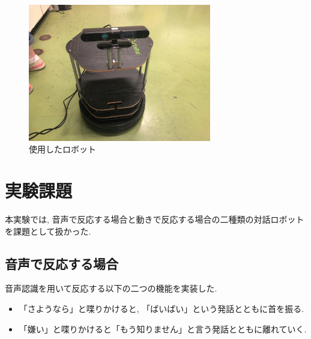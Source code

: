\documentclass[a4paper,11pt,titlepage]{jsarticle}
\begin{document}
\begin{figure}[H]
  \begin{center}
    \includegraphics[width = 8cm]{画像/robot.jpg}
    \caption{使用したロボット}
    \label{ロボット}
  \end{center}
\end{figure}

\section{実験課題}
本実験では, 音声で反応する場合と動きで反応する場合の二種類の対話ロボットを課題として扱かった.
\subsection{音声で反応する場合}
音声認識を用いて反応する以下の二つの機能を実装した.
\begin{itemize}
  \item 「さようなら」と喋りかけると, 「ばいばい」という発話とともに首を振る.
  \item 「嫌い」と喋りかけると「もう知りません」と言う発話とともに離れていく.
\end{itemize}
\end{document}

